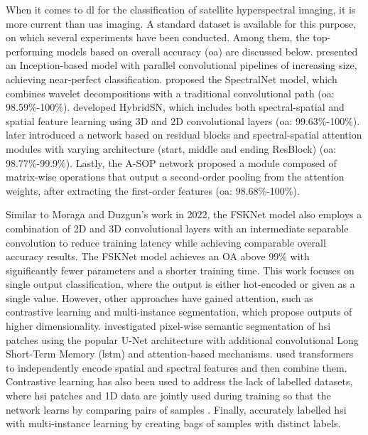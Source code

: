 When it comes to \acrshort{dl} for the classification of satellite hyperspectral imaging, it is more current than \acrshort{uas} imaging. A standard dataset is available for this purpose, on which several experiments have been conducted. Among them, the top-performing models based on overall accuracy (\acrshort{oa}) are discussed below. \cite{moraga_jigsawhsi_2022} presented an Inception-based model with parallel convolutional pipelines of increasing size, achieving near-perfect classification. \cite{chakraborty_spectralnet_2021} proposed the SpectralNet model, which combines wavelet decompositions with a traditional convolutional path (\acrshort{oa}: 98.59\%-100\%). \cite{roy_hybridsn_2020} developed HybridSN, which includes both spectral-spatial and spatial feature learning using 3D and 2D convolutional layers (\acrshort{oa}: 99.63\%-100\%). \cite{roy_attention-based_2021} later introduced a network based on residual blocks and spectral-spatial attention modules with varying architecture (start, middle and ending ResBlock) (\acrshort{oa}: 98.77\%-99.9\%). Lastly, the A-SOP network \cite{xue_attention-based_2021} proposed a module composed of matrix-wise operations that output a second-order pooling from the attention weights, after extracting the first-order features (\acrshort{oa}: 98.68\%-100\%). 

Similar to Moraga and Duzgun's work in 2022, the FSKNet model also employs a combination of 2D and 3D convolutional layers with an intermediate separable convolution to reduce training latency while achieving comparable overall accuracy results. The FSKNet model achieves an OA above 99\% with significantly fewer parameters and a shorter training time. This work focuses on single output classification, where the output is either hot-encoded or given as a single value. However, other approaches have gained attention, such as contrastive learning and multi-instance segmentation, which propose outputs of higher dimensionality. \cite{zhu_spectral-spatial-dependent_2021} investigated pixel-wise semantic segmentation of \acrshort{hsi} patches using the popular U-Net architecture with additional convolutional Long Short-Term Memory (\acrshort{lstm}) and attention-based mechanisms. \cite{xin_convolution_2022} used transformers to independently encode spatial and spectral features and then combine them. Contrastive learning has also been used to address the lack of labelled datasets, where \acrshort{hsi} patches and 1D data are jointly used during training so that the network learns by comparing pairs of samples \cite{guan_spatial-spectral_2022}. Finally, \cite{meerdink_multitarget_2022} accurately labelled \acrshort{hsi} with multi-instance learning by creating bags of samples with distinct labels.

